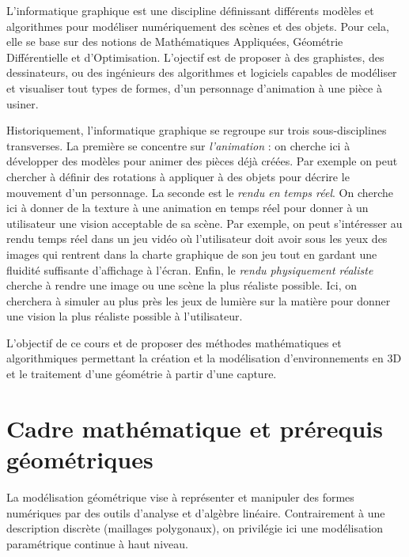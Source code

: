 
\minitoc

L'informatique graphique est une discipline définissant différents modèles et algorithmes pour modéliser numériquement des scènes et des objets. Pour cela, elle se base sur des notions de Mathématiques Appliquées, Géométrie Différentielle et d'Optimisation. 
L'ojectif est de proposer à des graphistes, des dessinateurs, ou des ingénieurs des algorithmes et logiciels capables de modéliser et visualiser tout types de formes, d'un personnage d'animation à une pièce à usiner. 

Historiquement, l'informatique graphique se regroupe sur trois sous-disciplines transverses. La première se concentre sur \emph{l'animation} : on cherche ici à développer des modèles pour animer des pièces déjà créées. Par exemple on peut chercher à définir des rotations à appliquer à des objets pour décrire le mouvement d'un personnage. 
La seconde est le \emph{rendu en temps réel}. On cherche ici à donner de la texture à une animation en temps réel pour donner à un utilisateur une vision acceptable de sa scène. Par exemple, on peut s'intéresser au rendu temps réel dans un jeu vidéo où l'utilisateur doit avoir sous les yeux des images qui rentrent dans la charte graphique de son jeu tout en gardant une fluidité suffisante d'affichage à l'écran. 
Enfin, le \emph{rendu physiquement réaliste} cherche à rendre une image ou une scène la plus réaliste possible. Ici, on cherchera à simuler au plus près les jeux de lumière sur la matière pour donner une vision la plus réaliste possible à l'utilisateur. 

L'objectif de ce cours et de proposer des méthodes mathématiques et algorithmiques permettant la création et la modélisation d'environnements en 3D et le traitement d'une géométrie à partir d'une capture. 


\section{Cadre mathématique et prérequis géométriques}

La modélisation géométrique vise à représenter et manipuler des formes numériques par des outils d'analyse et d'algèbre linéaire. Contrairement à une description discrète (maillages polygonaux), on privilégie ici une modélisation paramétrique continue à haut niveau.

